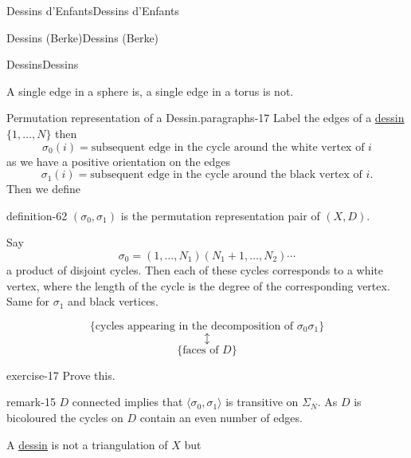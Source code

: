 \documentclass[10pt,]{book}
\numberwithin{equation}{section}
\begin{document}
\begin{chapterptx}{Dessins d'Enfants}{}{Dessins d'Enfants}{}{}
\begin{sectionptx}{Dessins (Berke)}{}{Dessins (Berke)}{}{}
\begin{subsectionptx}{Dessins}{}{Dessins}{}{}
\par
\hypertarget{p-639}{}%
A single edge in a sphere is, a single edge in a torus is not.%
\begin{paragraphs}{Permutation representation of a Dessin.}{paragraphs-17}%
\hypertarget{p-640}{}%
Label the edges of  a \hyperref[def-dessin-denfant]{dessin} \(\{1, \ldots, N\}\) then%
\begin{equation*}
\sigma_0(i) = \text{subsequent edge in the cycle around the white vertex of }i
\end{equation*}
as we have a positive orientation on the edges%
\begin{equation*}
\sigma_1(i) = \text{subsequent edge in the cycle around the black vertex of }i\text{.}
\end{equation*}
Then we define%
\begin{definition}{}{definition-62}%
\hypertarget{p-641}{}%
\((\sigma_0, \sigma_1)\) is the permutation representation pair of \((X,D)\).%
\end{definition}
\hypertarget{p-642}{}%
Say%
\begin{equation*}
\sigma_0 = (1 , \ldots, N_1) (N_1 + 1 , \ldots, N_2)\cdots
\end{equation*}
a product of disjoint cycles. Then each of these cycles corresponds to a  white vertex, where the length of the cycle is the degree of the corresponding vertex. Same for \(\sigma_1\) and black vertices.%
\par
\hypertarget{p-643}{}%
%
\begin{equation*}
\{\text{cycles appearing in the decomposition of }\sigma_0\sigma_1\}
\end{equation*}
%
\begin{equation*}
\updownarrow
\end{equation*}
%
\begin{equation*}
\{\text{faces of }D\}
\end{equation*}
%
\begin{inlineexercise}{}{exercise-17}%
\hypertarget{p-644}{}%
Prove this.%
\end{inlineexercise}
\begin{remark}{}{remark-15}%
\hypertarget{p-645}{}%
\(D\) connected implies that \(\langle \sigma_0, \sigma_1 \rangle\) is transitive on \(\Sigma_N\). As \(D\) is bicoloured the cycles on \(D\) contain an even number of edges.%
\end{remark}
\hypertarget{p-646}{}%
A \hyperref[def-dessin-denfant]{dessin} is not a triangulation of \(X\) but%
\begin{equation*}

\end{equation*}
\end{paragraphs}
\end{subsectionptx}
\end{sectionptx}
\end{chapterptx}
\end{document}
